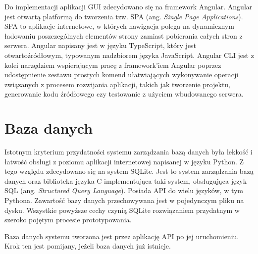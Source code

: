 		Do implementacji aplikacji GUI zdecydowano się na framework Angular. Angular jest otwartą platformą do tworzenia tzw. SPA (ang. \textit{Single Page Applications}). SPA to aplikacje internetowe, w których nawigacja polega na dynamicznym ładowaniu poszczególnych elementów strony zamiast pobierania całych stron z serwera. Angular napisany jest w języku TypeScript, który jest otwartoźródłowym, typowanym nadzbiorem języka JavaScript. Angular CLI jest z kolei narzędziem wspierającym pracę z framework'iem Angular poprzez udostępnienie zestawu prostych komend ułatwiających wykonywanie operacji związanych z procesem rozwijania aplikacji, takich jak tworzenie projektu, generowanie kodu źródłowego czy testowanie z użyciem wbudowanego serwera.

    \section{Baza danych}
    \label{s:db}

    	Istotnym kryterium przydatności systemu zarządzania bazą danych była lekkość i łatwość obsługi z poziomu aplikacji internetowej napisanej w języku Python. Z tego względu zdecydowano się na system SQLite. Jest to system zarządzania bazą danych oraz biblioteka języka C implementująca taki system, obsługująca język SQL (ang. \textit{Structured Query Language}). Posiada API do wielu języków, w tym Pythona. Zawartość bazy danych przechowywana jest w pojedynczym pliku na dysku. Wszystkie powyższe cechy czynią SQLite rozwiązaniem przydatnym w szeroko pojętym procesie prototypowania.

    	Baza danych systemu tworzona jest przez aplikację API po jej uruchomieniu. Krok ten jest pomijany, jeżeli baza danych już istnieje.
